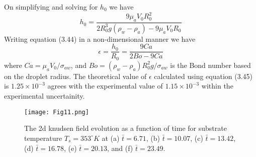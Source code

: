 \documentclass{jfm}
\begin{document}
On simplifying and solving for $h_0$ we have
\begin{equation}
    h_0 = \frac{9{\mu}_aV_0R_0^2}{2R_0^3g({\rho}_w - {\rho}_a) - 9{\mu}_aV_0R_0}
\end{equation}
Writing equation (3.44) in a non-dimensional manner we have
\begin{equation}
    {\epsilon}=\frac{h_0}{R_0} = \frac{9Ca}{2Bo - 9Ca}
\end{equation}
 where $Ca={\mu}_aV_0/{\sigma}_{aw}$, and $Bo = ({\rho}_w - {\rho}_a)R_0^2g/{\sigma}_{aw}$ is the Bond number based on the droplet radius. The theoretical value of ${\epsilon}$ calculated using equation (3.45) is $1.25{\times}10^{-3}$ agrees with the experimental value of $1.15{\times}10^{-3}$ within the experimental uncertainity.
\begin{figure*}
    \centering
    \texttt{[image: Fig11.png]}
    \caption{
    The 2d knudsen field evolution as a function of time for substrate temperature ${T}_s=353^{\circ}K$ at (a) $\bar{t}=6.71$, (b) $\bar{t}=10.07$, (c) $\bar{t}=13.42$, (d) $\bar{t}=16.78$, (e) $\bar{t}=20.13$, and (f) $\bar{t}=23.49$.}
    \label{Figure11}
\end{figure*}
\end{document}

